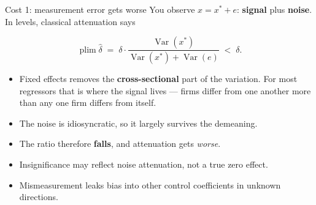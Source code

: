 \documentclass[
  11pt,
  ignorenonframetext,
  aspectratio=169,
]{beamer}
\providecommand{\tightlist}{%
  \setlength{\itemsep}{0pt}\setlength{\parskip}{0pt}}
\begin{document}
\begin{frame}{Cost 1: measurement error gets worse}
\protect{}\label{cost-1-measurement-error-gets-worse}
You observe \(x = x^* + e\): \textbf{signal} plus \textbf{noise}. In
levels, classical attenuation says

\[
\operatorname{plim} \hat\delta \;=\; \delta \cdot \frac{\operatorname{Var}(x^*)}{\operatorname{Var}(x^*) + \operatorname{Var}(e)} \;<\; \delta .
\]

\begin{itemize}
\tightlist
\item
  Fixed effects removes the \textbf{cross-sectional} part of the
  variation. For most regressors that is where the signal lives ---
  firms differ from one another more than any one firm differs from
  itself.
\item
  The noise is idiosyncratic, so it largely survives the demeaning.
\item
  The ratio therefore \textbf{falls}, and attenuation gets \emph{worse}.
\end{itemize}

\vspace{0.3em}

\begin{itemize}
\tightlist
\item
  Insignificance may reflect noise attenuation, not a true zero effect.
\item
  Mismeasurement leaks bias into other control coefficients in unknown
  directions.
\end{itemize}
\end{frame}
\end{document}
